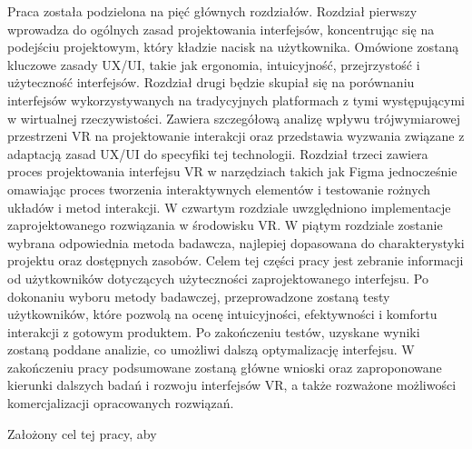 \documentclass[xodstep]{wnspt}
\begin{document}
Praca została podzielona na pięć głównych rozdziałów. Rozdział pierwszy wprowadza do ogólnych zasad projektowania interfejsów, koncentrując się na podejściu projektowym, który kładzie nacisk na użytkownika. Omówione zostaną kluczowe zasady UX/UI, takie jak ergonomia, intuicyjność, przejrzystość i użyteczność interfejsów. Rozdział drugi będzie skupiał się na porównaniu interfejsów wykorzystywanych na tradycyjnych platformach z tymi występującymi w wirtualnej rzeczywistości. Zawiera szczegółową analizę wpływu trójwymiarowej przestrzeni VR na projektowanie interakcji oraz przedstawia wyzwania związane z adaptacją zasad UX/UI do specyfiki tej technologii. Rozdział trzeci zawiera proces projektowania interfejsu VR w narzędziach takich jak Figma jednocześnie omawiając proces tworzenia interaktywnych elementów i testowanie rożnych układów i metod interakcji. W czwartym rozdziale uwzględniono implementacje zaprojektowanego rozwiązania w środowisku VR.
W piątym rozdziale zostanie wybrana odpowiednia metoda badawcza, najlepiej dopasowana do charakterystyki projektu oraz dostępnych zasobów. Celem tej części pracy jest zebranie informacji od użytkowników dotyczących użyteczności zaprojektowanego interfejsu. Po dokonaniu wyboru metody badawczej, przeprowadzone zostaną testy użytkowników, które pozwolą na ocenę intuicyjności, efektywności i komfortu interakcji z gotowym produktem. Po zakończeniu testów, uzyskane wyniki zostaną poddane analizie, co umożliwi dalszą optymalizację interfejsu. 
W zakończeniu pracy podsumowane zostaną główne wnioski oraz zaproponowane kierunki dalszych badań i rozwoju interfejsów VR, a także rozważone możliwości komercjalizacji opracowanych rozwiązań.








\summary
Założony cel tej pracy, aby 



\printbibliography[type=book,title={Books only}]
\listoffigures

\lstlistoflistings
\end{document}
